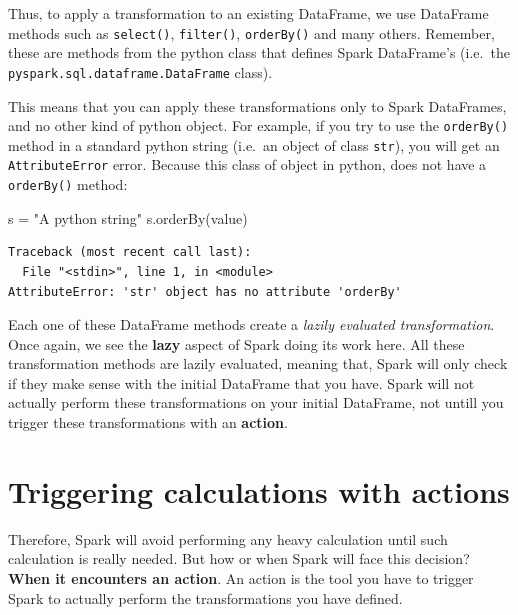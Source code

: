 \documentclass[
  11pt,
  letterpaper,
  DIV=11,
  numbers=noendperiod]{scrreprt}
\newenvironment{Shaded}{\begin{snugshade}}{\end{snugshade}}
\newcommand{\NormalTok}[1]{\textcolor[rgb]{0.00,0.23,0.31}{#1}}
\newcommand{\OperatorTok}[1]{\textcolor[rgb]{0.37,0.37,0.37}{#1}}
\newcommand{\StringTok}[1]{\textcolor[rgb]{0.13,0.47,0.30}{#1}}
\begin{document}
Thus, to apply a transformation to an existing DataFrame, we use
DataFrame methods such as \texttt{select()}, \texttt{filter()},
\texttt{orderBy()} and many others. Remember, these are methods from the
python class that defines Spark DataFrame's (i.e.~the
\texttt{pyspark.sql.dataframe.DataFrame} class).

This means that you can apply these transformations only to Spark
DataFrames, and no other kind of python object. For example, if you try
to use the \texttt{orderBy()} method in a standard python string
(i.e.~an object of class \texttt{str}), you will get an
\texttt{AttributeError} error. Because this class of object in python,
does not have a \texttt{orderBy()} method:

\begin{Shaded}
\begin{Highlighting}[]
\NormalTok{s }\OperatorTok{=} \StringTok{"A python string"}
\NormalTok{s.orderBy(}\StringTok{\textquotesingle{}value\textquotesingle{}}\NormalTok{)}
\end{Highlighting}
\end{Shaded}

\begin{verbatim}
Traceback (most recent call last):
  File "<stdin>", line 1, in <module>
AttributeError: 'str' object has no attribute 'orderBy'
\end{verbatim}

Each one of these DataFrame methods create a \emph{lazily evaluated
transformation}. Once again, we see the \textbf{lazy} aspect of Spark
doing its work here. All these transformation methods are lazily
evaluated, meaning that, Spark will only check if they make sense with
the initial DataFrame that you have. Spark will not actually perform
these transformations on your initial DataFrame, not untill you trigger
these transformations with an \textbf{action}.

\hypertarget{sec-dataframe-actions}{%
\section{Triggering calculations with
actions}\label{sec-dataframe-actions}}

Therefore, Spark will avoid performing any heavy calculation until such
calculation is really needed. But how or when Spark will face this
decision? \textbf{When it encounters an action}. An action is the tool
you have to trigger Spark to actually perform the transformations you
have defined.
\end{document}
